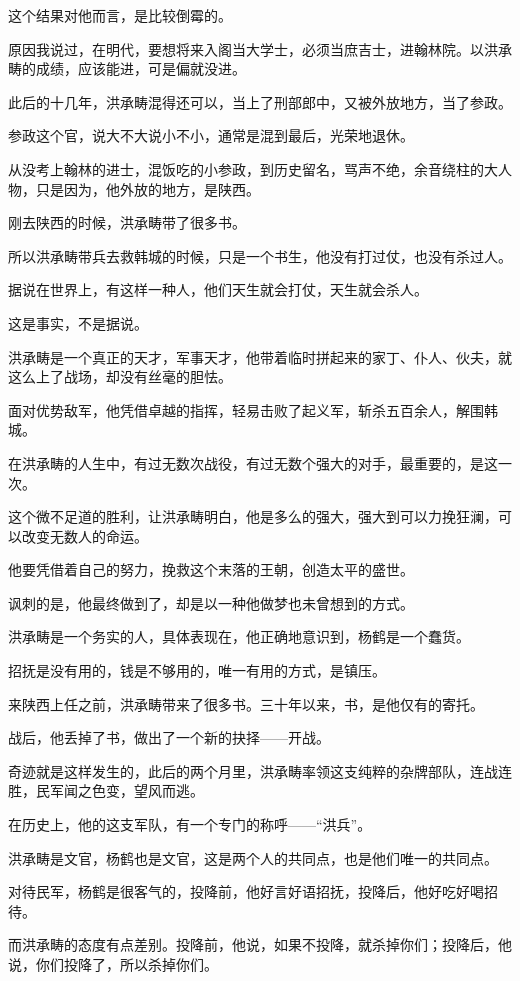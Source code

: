 \begin{multicols}{\theparacolNo}
这个结果对他而言，是比较倒霉的。

原因我说过，在明代，要想将来入阁当大学士，必须当庶吉士，进翰林院。以洪承畴的成绩，应该能进，可是偏就没进。

此后的十几年，洪承畴混得还可以，当上了刑部郎中，又被外放地方，当了参政。

参政这个官，说大不大说小不小，通常是混到最后，光荣地退休。

从没考上翰林的进士，混饭吃的小参政，到历史留名，骂声不绝，余音绕柱的大人物，只是因为，他外放的地方，是陕西。

刚去陕西的时候，洪承畴带了很多书。

所以洪承畴带兵去救韩城的时候，只是一个书生，他没有打过仗，也没有杀过人。

据说在世界上，有这样一种人，他们天生就会打仗，天生就会杀人。

这是事实，不是据说。

洪承畴是一个真正的天才，军事天才，他带着临时拼起来的家丁、仆人、伙夫，就这么上了战场，却没有丝毫的胆怯。

面对优势敌军，他凭借卓越的指挥，轻易击败了起义军，斩杀五百余人，解围韩城。

在洪承畴的人生中，有过无数次战役，有过无数个强大的对手，最重要的，是这一次。

这个微不足道的胜利，让洪承畴明白，他是多么的强大，强大到可以力挽狂澜，可以改变无数人的命运。

他要凭借着自己的努力，挽救这个末落的王朝，创造太平的盛世。

讽刺的是，他最终做到了，却是以一种他做梦也未曾想到的方式。

洪承畴是一个务实的人，具体表现在，他正确地意识到，杨鹤是一个蠢货。

招抚是没有用的，钱是不够用的，唯一有用的方式，是镇压。

来陕西上任之前，洪承畴带来了很多书。三十年以来，书，是他仅有的寄托。

战后，他丢掉了书，做出了一个新的抉择——开战。

奇迹就是这样发生的，此后的两个月里，洪承畴率领这支纯粹的杂牌部队，连战连胜，民军闻之色变，望风而逃。

在历史上，他的这支军队，有一个专门的称呼——“洪兵”。

洪承畴是文官，杨鹤也是文官，这是两个人的共同点，也是他们唯一的共同点。

对待民军，杨鹤是很客气的，投降前，他好言好语招抚，投降后，他好吃好喝招待。

而洪承畴的态度有点差别。投降前，他说，如果不投降，就杀掉你们；投降后，他说，你们投降了，所以杀掉你们。


\end{multicols}
